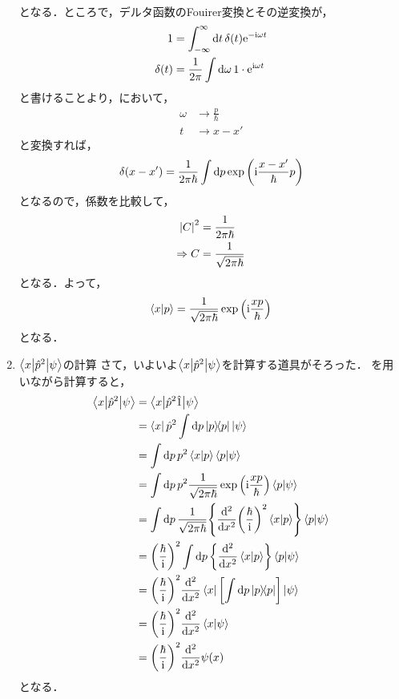\documentclass{report}
\begin{document}
\begin{enumerate}
\begin{align}
        \end{align}
        となる．ところで，デルタ函数のFouirer変換とその逆変換が，
        \begin{align}
          1 &= \int_{-\infty}^{\infty}\dd{t}\delta(t)\mathrm{e}^{-\mathrm{i}\omega t} \\ 
          \delta(t) &= \frac{1}{2\pi}\int\dd{\omega}1\cdot\mathrm{e}^{\mathrm{i}\omega t}\label{delta-fourier-inv}
        \end{align}
        と書けることより，において，
        \begin{align}
          \omega &\to \frac{p}{\hbar} \\ 
          t &\to x - x'
        \end{align}
        と変換すれば，
        \begin{align}
          \delta(x - x') = \frac{1}{2\pi\hbar}\int\dd{p}\exp\qty(\mathrm{i}\frac{x - x'}{\hbar}p)
        \end{align}
        となるので，係数を比較して，
        \begin{align}
          \abs{C}^2 &= \frac{1}{2\pi\hbar} \\ 
          \Rightarrow C &= \frac{1}{\sqrt{2\pi\hbar}} 
        \end{align}
        となる．よって，
        \begin{align}
          \braket{x}{p} = \frac{1}{\sqrt{2\pi\hbar}}\exp\qty(\mathrm{i}\frac{xp}{\hbar})\label{braket-xp}
        \end{align}
        となる．
      \item $\mel**{x}{\hat{p}^2}{\psi}$の計算
        さて，いよいよ$\mel**{x}{\hat{p}^2}{\psi}$を計算する道具がそろった．
        を用いながら計算すると，
        \begin{align}
          \mel**{x}{\hat{p}^2}{\psi} &= \mel**{x}{\hat{p}^2\hat{1}}{\psi} \\
          &= \bra{x}\hat{p}^2\int\dd{p}\ketbra{p}{p}\ket{\psi} \\ 
          &= \int\dd{p}p^2\braket{x}{p}\braket{p}{\psi} \\ 
          &= \int\dd{p}p^2\frac{1}{\sqrt{2\pi\hbar}}\exp\qty(\mathrm{i}\frac{xp}{\hbar})\braket{p}{\psi} \\ 
          &= \int\dd{p}\frac{1}{\sqrt{2\pi\hbar}}\qty{\dv[2]{x}\qty(\frac{\hbar}{\mathrm{i}})^2\braket{x}{p}}\braket{p}{\psi} \\ 
          &= \qty(\frac{\hbar}{\mathrm{i}})^2\int\dd{p}\qty{\dv[2]{x}\braket{x}{p}}\braket{p}{\psi} \\ 
          &= \qty(\frac{\hbar}{\mathrm{i}})^2\dv[2]{x}\bra{x}\qty[\int\dd{p}\ketbra{p}{p}]\ket{\psi} \\ 
          &= \qty(\frac{\hbar}{\mathrm{i}})^2\dv[2]{x}\braket{x}{\psi} \\
          &= \qty(\frac{\hbar}{\mathrm{i}})^2\dv[2]{x}\psi(x)\label{before-schrodinger-oscillator}
        \end{align}
        となる．
    \end{enumerate}
\end{document}
